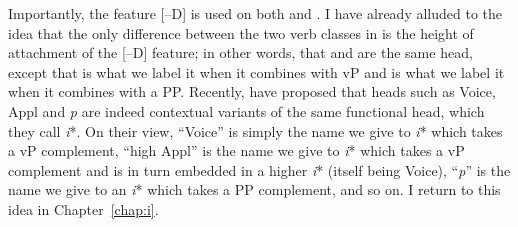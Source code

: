 \begin{exe}
\begin{xlist}
\begin{xlist}
\begin{exe}
\begin{xlist}
\begin{xlist}
\begin{exe}
\begin{xlist}
\begin{xlist}
\begin{exe}
\begin{exe}
\begin{xlist}
\begin{exe}
\begin{exe}
\begin{xlist}
\begin{exe}
\begin{exe}
\begin{exe}
\begin{exe}
\begin{exe}
\begin{xlist}
\begin{exe}
\begin{xlist}
\begin{exe}
\begin{exe}
\begin{xlist}
\begin{exe}
\begin{xlist}
\begin{exe}
\begin{exe}
\begin{exe}
\begin{xlist}
\begin{exe}
\begin{exe}
\begin{exe}
\begin{xlist}
\begin{exe}
\begin{xlist}
\begin{exe}
\begin{xlist}
\begin{exe}
\begin{xlist}
\begin{exe}
\begin{exe}
\begin{exe}
\begin{exe}
\begin{xlist}
\begin{exe}
\begin{xlist}
\begin{exe}
\begin{xlist}
\begin{exe}
\begin{xlist}
\begin{exe}
\begin{xlist}
\begin{exe}
\begin{xlist}
\begin{exe}
\begin{exe}
\begin{exe}
\begin{exe}
\begin{xlist}
\begin{exe}
\begin{xlist}
\begin{exe}
\begin{xlist}
\begin{exe}
Importantly, the feature [--D] is used on both {\vz} and {\pz}. I have already alluded to the idea that the only difference between the two verb classes in {\tnif} is the height of attachment of the [--D] feature; in other words, that {\vz} and {\pz} are the same head, except that {\vz} is what we label it when it combines with vP and {\pz} is what we label it when it combines with a PP. Recently, \cite{woodmarantz17} have proposed that heads such as Voice, Appl and \emph{p} are indeed contextual variants of the same functional head, which they call \emph{i}*. On their view, ``Voice'' is simply the name we give to \emph{i}* which takes a vP complement, ``high Appl'' is the name we give to \emph{i}* which takes a vP complement and is in turn embedded in a higher \emph{i}* (itself being Voice), ``\emph{p}'' is the name we give to an \emph{i}* which takes a PP complement, and so on. I return to this idea in Chapter~\ref{chap:i}.


\end{exe}
\end{xlist}
\end{exe}
\end{xlist}
\end{exe}
\end{xlist}
\end{exe}
\end{exe}
\end{exe}
\end{exe}
\end{xlist}
\end{exe}
\end{xlist}
\end{exe}
\end{xlist}
\end{exe}
\end{xlist}
\end{exe}
\end{xlist}
\end{exe}
\end{xlist}
\end{exe}
\end{exe}
\end{exe}
\end{exe}
\end{xlist}
\end{exe}
\end{xlist}
\end{exe}
\end{xlist}
\end{exe}
\end{xlist}
\end{exe}
\end{exe}
\end{exe}
\end{xlist}
\end{exe}
\end{exe}
\end{exe}
\end{xlist}
\end{exe}
\end{xlist}
\end{exe}
\end{exe}
\end{xlist}
\end{exe}
\end{xlist}
\end{exe}
\end{exe}
\end{exe}
\end{exe}
\end{exe}
\end{xlist}
\end{exe}
\end{exe}
\end{xlist}
\end{exe}
\end{exe}
\end{xlist}
\end{xlist}
\end{exe}
\end{xlist}
\end{xlist}
\end{exe}
\end{xlist}
\end{xlist}
\end{exe}

